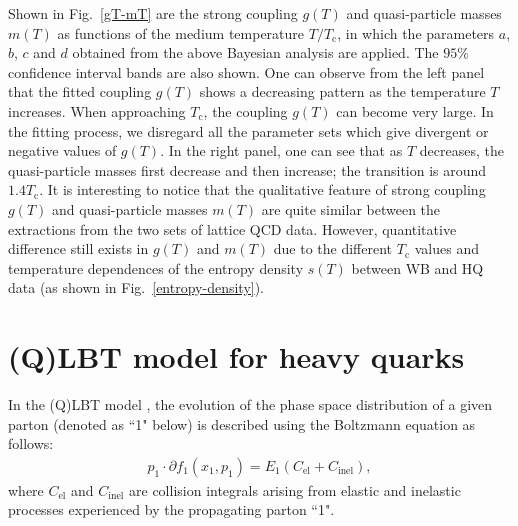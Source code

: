 \documentclass[aps,superscriptaddress,prc,twocolumn,nofootinbib]{revtex4}
\begin{document}
Shown in Fig.~\ref{gT-mT} are the strong coupling $g(T)$ and quasi-particle masses $m(T)$ as functions of the medium temperature $T/T_\mathrm{c}$, in which the parameters $a$, $b$, $c$ and $d$ obtained from the above Bayesian analysis are applied.
The $95\%$ confidence interval bands are also shown.
One can observe from the left panel that the fitted coupling $g(T)$ shows a decreasing pattern as the temperature $T$ increases. When approaching $T_\mathrm{c}$, the coupling $g(T)$ can become very large.
In the fitting process, we disregard all the parameter sets which give divergent or negative values of $g(T)$.
In the right panel, one can see that as $T$ decreases, the quasi-particle masses first decrease and then increase; the transition is around $1.4T_\mathrm{c}$.
It is interesting to notice that the qualitative feature of strong coupling $g(T)$ and quasi-particle masses $m(T)$ are quite similar between the extractions from the two sets of lattice QCD data. However, quantitative difference still exists in $g(T)$ and $m(T)$ due to the different $T_\mathrm{c}$ values and temperature dependences of the entropy density $s(T)$ between WB and HQ data (as shown in Fig.~\ref{entropy-density}).



\section{(Q)LBT model for heavy quarks}
\label{sec:QLBT}

In the (Q)LBT model \cite{Wang:2013cia, He:2015pra, Cao:2016gvr, Cao:2017hhk, Xing:2019xae}, the evolution of the phase space distribution of a given parton (denoted as ``1" below) is described using the Boltzmann equation as follows:
\begin{align}
  \label{eq:boltzmann1}
  p_1\cdot\partial f_1(x_1,p_1)=E_1 (C_\mathrm{el} + C_\mathrm{inel}),
\end{align}
where $C_\mathrm{el}$ and $C_\mathrm{inel}$ are collision integrals arising from elastic and inelastic processes experienced by the propagating parton ``1".
\end{document}
